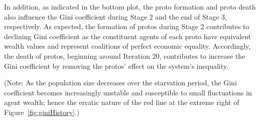     In addition, as indicated in the bottom plot, the proto formation and proto death also influence the Gini coefficient during Stage 2 and the end of Stage 3, respectively. As expected, the formation of protos during Stage 2 contributes to declining Gini coefficient as the constituent agents of each proto have equivalent wealth values and represent coalitions of perfect economic equality. Accordingly, the death of protos, beginning around Iteration 20, contributes to increase the Gini coefficient by removing the protos' effect on the system's inequality. 

    (Note: As the population size decreases over the starvation period, the Gini coefficient becomes increasingly unstable and susceptible to small fluctuations in agent wealth; hence the erratic nature of the red line at the extreme right of Figure~\ref{fig:giniHistory}.)

